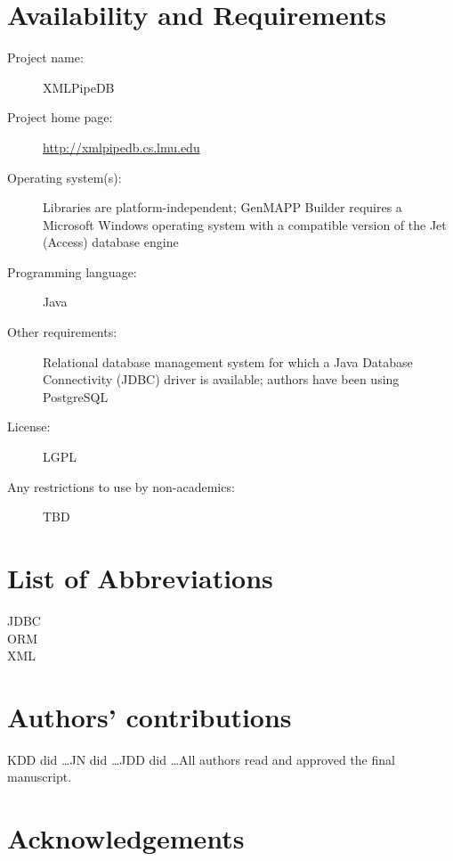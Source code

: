 \documentclass[10pt]{bmc_article}
\newenvironment{bmcformat}{\begin{raggedright}\baselineskip20pt\sloppy\setboolean{publ}{false}}{\end{raggedright}\baselineskip20pt\sloppy}
\begin{document}
\begin{bmcformat}
\section*{Availability and Requirements}

\begin{description}
\item[Project name:] XMLPipeDB
\item[Project home page:] \url{http://xmlpipedb.cs.lmu.edu}
\item[Operating system(s):] Libraries are platform-independent; GenMAPP Builder requires a Microsoft Windows operating system with a compatible version of the Jet (Access) database engine
\item[Programming language:] Java
\item[Other requirements:] Relational database management system for which a Java Database Connectivity (JDBC) driver is available; authors have been using PostgreSQL
\item[License:] LGPL
\item[Any restrictions to use by non-academics:] TBD
\end{description}


\section*{List of Abbreviations}


\begin{description}
\item[JDBC]
\item[ORM]
\item[XML]
\end{description}

    
\section*{Authors' contributions}


KDD did \ldots  JN did \ldots  JDD did \ldots  All authors read and approved the final manuscript.

    

\section*{Acknowledgements}


\end{bmcformat}
\end{document}
